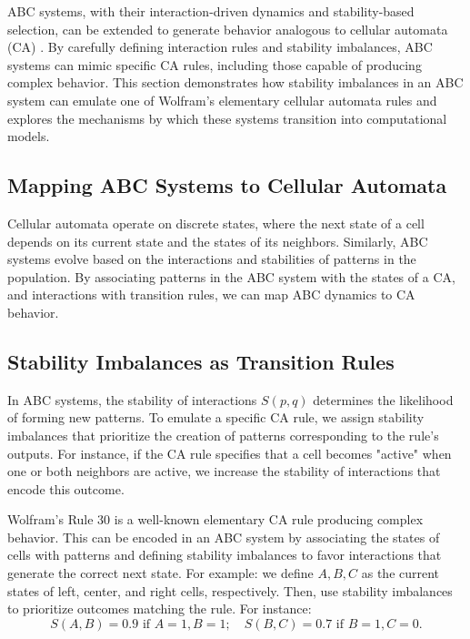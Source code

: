 \documentclass[entropy,article,submit,pdftex,moreauthors]{Definitions/mdpi}
\begin{document}
ABC systems, with their interaction-driven dynamics and stability-based selection, can be extended to generate behavior analogous to cellular automata (CA) \cite{wolfram2002new}. By carefully defining interaction rules and stability imbalances, ABC systems can mimic specific CA rules, including those capable of producing complex behavior. This section demonstrates how stability imbalances in an ABC system can emulate one of Wolfram’s elementary cellular automata rules and explores the mechanisms by which these systems transition into computational models.

\subsection{Mapping ABC Systems to Cellular Automata}

Cellular automata operate on discrete states, where the next state of a cell depends on its current state and the states of its neighbors. Similarly, ABC systems evolve based on the interactions and stabilities of patterns in the population. By associating patterns in the ABC system with the states of a CA, and interactions with transition rules, we can map ABC dynamics to CA behavior.

\subsection{Stability Imbalances as Transition Rules}

In ABC systems, the stability of interactions \( S(p, q) \) determines the likelihood of forming new patterns. To emulate a specific CA rule, we assign stability imbalances that prioritize the creation of patterns corresponding to the rule’s outputs. For instance, if the CA rule specifies that a cell becomes "active" when one or both neighbors are active, we increase the stability of interactions that encode this outcome.

Wolfram’s Rule 30 \cite{wolfram1983statistical} is a well-known elementary CA rule producing complex behavior. 
This can be encoded in an ABC system by associating the states of cells with patterns and defining stability imbalances to favor interactions that generate the correct next state. For example: we define \( A, B, C \) as the current states of left, center, and right cells, respectively. Then, use stability imbalances to prioritize outcomes matching the rule. For instance:
    \[
    S(A, B) = 0.9 \text{ if } A = 1, B = 1; \quad S(B, C) = 0.7 \text{ if } B = 1, C = 0.
    \]
\end{document}
